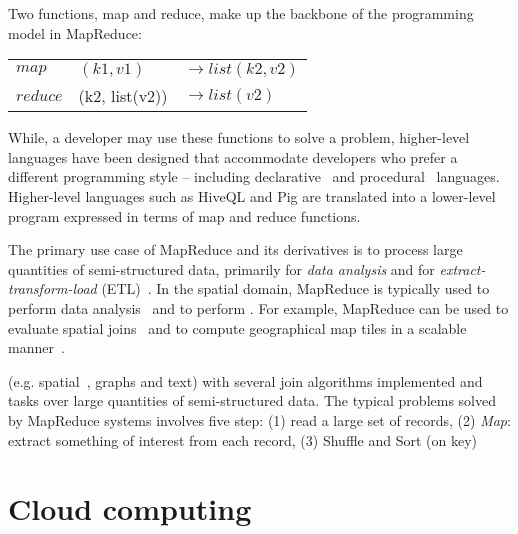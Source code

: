 \documentclass[11pt, oneside]{report}   	%
\begin{document}
Two functions, map and reduce, make up the backbone of the programming model in MapReduce:

\begin{tabular}{l l l}
$map$ & $(k1, v1)$ & $\rightarrow list(k2, v2)$\\ 
$reduce$ & (k2, list(v2)) & $\rightarrow list(v2)$ \\
\end{tabular}


While, a developer may use these functions to solve a problem, higher-level languages have been designed that accommodate developers who prefer a different programming style -- including declarative~\cite{thusoo2009hive} and procedural~\cite{olston2008pig,eldawy2014pigeon} languages. Higher-level languages such as HiveQL and Pig are translated into a lower-level program expressed in terms of map and reduce functions.

The primary use case of MapReduce and its derivatives is to process large quantities of semi-structured data, primarily for \emph{data analysis} and for \emph{extract-transform-load} (ETL)~\cite{stonebraker2010friendsorfoes}. In the spatial domain, MapReduce is typically used to perform data analysis~\cite{aji2012largespatial} and to perform . For example, MapReduce can be used to evaluate spatial joins~\cite{zhang2009mapreduce} and to compute geographical map tiles in a scalable manner~\cite{dean2009lessons}.



 (e.g. spatial~{}, graphs and text{}) with several join algorithms implemented and  tasks over large quantities of semi-structured data. The typical problems solved by MapReduce systems involves five step: (1) read a large set of records, (2) \emph{Map}: extract something of interest from each record, (3) Shuffle and Sort (on key)


\chapter{Cloud computing}







\end{document}
